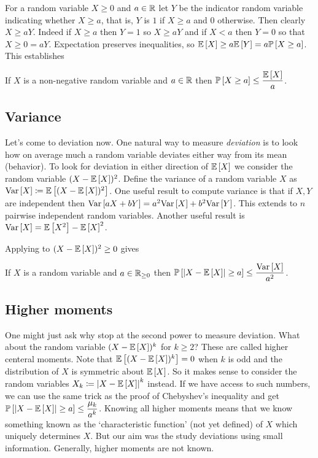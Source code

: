 For a random variable $X\ge 0$ and $a\in\mathbb{R}$ let $Y$ be the indicator random variable indicating whether $X\ge a$, that is, $Y$ is $1$ if $X\ge a$ and $0$ otherwise. Then clearly $X \ge aY$. Indeed if $X\ge a$ then $Y=1$ so $X\ge aY$ and if $X<a$ then $Y=0$ so that $X \ge 0 = aY$. Expectation preserves inequalities, so $\mathbb E\left[ X \right] \ge a\mathbb E\left[ Y \right] = a\mathbb P\left[ X\ge a \right]$. This establishes
\begin{thm}\label{thm:markov}
If $X$ is a non-negative random variable and $a\in\mathbb{R}$ then $\mathbb P\left[ X\ge a \right]\le \dfrac{\mathbb E\left[ X \right]}{a}$.
\end{thm}

\subsection{Variance}
Let's come to deviation now. One natural way to measure \textit{deviation} is to look how on average much a random variable deviates either way from its mean (behavior). To look for deviation in either direction of $\mathbb E\left[ X \right]$ we consider the random variable $(X-\mathbb E\left[ X \right])^{2}$. Define the variance of a random variable $X$ as $\text{Var}\left[ X \right] \coloneqq \mathbb E\left[ (X-\mathbb E\left[ X \right])^{2} \right]$. One useful result to compute variance is that if $X,Y$ are independent then $\text{Var}\left[ aX+bY \right] = a^{2}\text{Var}\left[ X \right] + b^{2}\text{Var}\left[ Y \right]$. This extends to $n$ pairwise independent random variables. Another useful result is $\text{Var}\left[ X \right] = \mathbb E\left[ X^{2} \right] - \mathbb E\left[ X \right]^{2}$.

Applying  to $(X-\mathbb E\left[ X \right])^{2}\ge 0$ gives 
\begin{thm}\label{thm:chebyshev}
If $X$ is a random variable and $a\in\mathbb{R}_{{\ge 0}}$ then $\mathbb P\left[ \left| X-\mathbb E\left[ X \right] \right|\ge a \right]\le \dfrac{\text{Var}\left[ X \right]}{a^{2}}$.
\end{thm}



\subsection{Higher moments}
One might just ask why stop at the second power to measure deviation. What about the random variable $(X-\mathbb E\left[ X \right])^{k}$ for $k\ge 2$? These are called higher centeral moments. Note that $\mathbb E\left[ (X-\mathbb E\left[ X \right])^{k} \right] = 0$ when $k$ is odd and the distribution of $X$ is symmetric about $\mathbb E\left[ X \right]$. So it makes sense to consider the random variables $X_{k}\coloneqq \left| X-\mathbb E\left[ X \right] \right|^{k}$ instead. If we have access to such numbers, we can use the same trick as the proof of Chebyshev's inequality and get $\mathbb P\left[ \left| X-\mathbb E\left[ X \right] \right|\ge a \right] \le \dfrac{\mu_{k}}{a^{k}}$. Knowing all higher moments means that we know something known as the `characteristic function' (not yet defined) of $X$ which uniquely determines $X$. But our aim was the study deviations using small information. Generally, higher moments are not known. 

